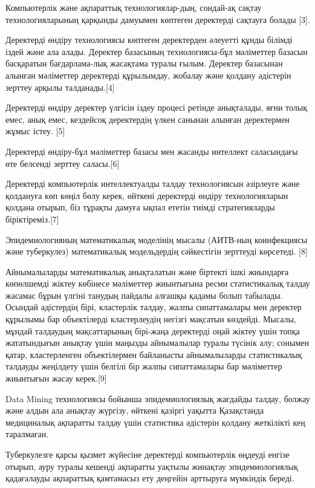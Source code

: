 \begin{multicols}{2}
Компьютерлік және ақпараттық технологиялар-дың, сондай-ақ сақтау
технологияларының қарқынды дамуымен көптеген деректерді сақтауға болады
{[}3{]}.

Деректерді өндіру технологиясы көптеген деректерден әлеуетті құнды
білімді іздей және ала алады. Деректер базасының технологиясы-бұл
мәліметтер базасын басқаратын бағдарлама-лық жасақтама туралы ғылым.
Деректер базасынан алынған мәліметтер деректерді құрылымдау, жобалау
және қолдану әдістерін зерттеу арқылы талданады.{[}4{]}

Деректерді өндіру деректер үлгісін іздеу процесі ретінде анықталады,
яғни толық емес, анық емес, кездейсоқ деректердің үлкен санынан алынған
деректермен жұмыс істеу. {[}5{]}

Деректерді өндіру-бұл мәліметтер базасы мен жасанды интеллект
саласындағы өте белсенді зерттеу саласы.{[}6{]}

Деректерді компьютерлік интеллектуалды талдау технологиясын әзірлеуге
және қолдануға көп көңіл бөлу керек, өйткені деректерді өндіру
технологияларын қолдана отырып, біз тұрақты дамуға ықпал ететін тиімді
стратегияларды біріктіреміз.{[}7{]}

Эпидемиологияның математикалық моделінің мысалы (АИТВ-ның коинфекциясы
және туберкулез) математикалық модельдердің сәйкестігін зерттеуді
көрсетеді. {[}8{]}

Айнымалыларды математикалық анықталатын және біртекті ішкі жиындарға
көпөлшемді жіктеу көбінесе мәліметтер жиынтығына ресми статистикалық
талдау жасамас бұрын үлгіні танудың пайдалы алғашқы қадамы болып
табылады. Осындай әдістердің бірі, кластерлік талдау, жалпы
сипаттамалары мен деректер құрылымы бар объектілерді кластерлеудің
негізгі мақсатын көздейді. Мысалы, мұндай талдаудың мақсаттарының
бірі-жаңа деректерді оңай жіктеу үшін топқа жататындығын анықтау үшін
маңызды айнымалылар туралы түсінік алу; сонымен қатар, кластерленген
объектілермен байланысты айнымалыларды статистикалық талдауды жеңілдету
үшін белгілі бір жалпы сипаттамалары бар мәліметтер жиынтығын жасау
керек.{[}9{]}

Data Mining технологиясы бойынша эпидемиологиялық жағдайды талдау,
болжау және алдын ала анықтау жүргізу, өйткені қазіргі уақытта
Қазақстанда медициналық ақпаратты талдау үшін статистика әдістерін
қолдану жеткілікті кең таралмаған.

Туберкулезге қарсы қызмет жүйесіне деректерді компьютерлік өңдеуді
енгізе отырып, ауру туралы кешенді ақпаратты уақтылы жинақтау
эпидемиологиялық қадағалауды ақпараттық қамтамасыз ету деңгейін
арттыруға мүмкіндік береді.


\end{multicols}
